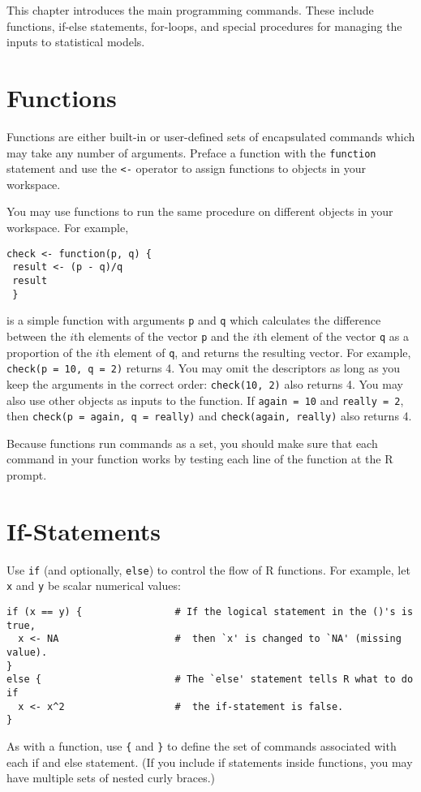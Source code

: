 This chapter introduces the main programming commands.  These include
functions, if-else statements, for-loops, and special procedures for
managing the inputs to statistical models.  

\section{Functions}

Functions are either built-in or user-defined sets of encapsulated
commands which may take any number of arguments.  Preface a function
with the {\tt function} statement and use the {\tt <-}
operator to assign functions to objects in your workspace.  

You may use functions to run the same procedure on different objects
in your workspace.  For example, 
\begin{verbatim}
check <- function(p, q) { 
 result <- (p - q)/q
 result
 }
\end{verbatim}
is a simple function with arguments {\tt p} and {\tt q} which
calculates the difference between the $i$th elements of the vector
{\tt p} and the $i$th element of the vector {\tt q} as a proportion of
the $i$th element of {\tt q}, and returns the resulting vector.  For
example, {\tt check(p = 10, q = 2)} returns 4.  You may omit the
descriptors as long as you keep the arguments in the correct order:
{\tt check(10, 2)} also returns 4.  You may also use other objects as
inputs to the function.  If {\tt again = 10} and {\tt really = 2},
then {\tt check(p = again, q = really)} and {\tt check(again, really)}
also returns 4.

Because functions run commands as a set, you should make sure that
each command in your function works by testing each line of the
function at the R prompt.

\section{If-Statements}

Use {\tt if} (and optionally, {\tt else}) to control the flow of R
functions.  For example, let {\tt x} and {\tt y} be scalar numerical
values:  
\begin{verbatim}
if (x == y) {                # If the logical statement in the ()'s is true,  
  x <- NA                    #  then `x' is changed to `NA' (missing value). 
}
else {                       # The `else' statement tells R what to do if  
  x <- x^2                   #  the if-statement is false.  
} 
\end{verbatim}
As with a function, use {\tt \{} and {\tt \}} to define the set of commands associated
with each if and else statement.  (If you include if
statements inside functions, you may have multiple sets of nested
curly braces.)


